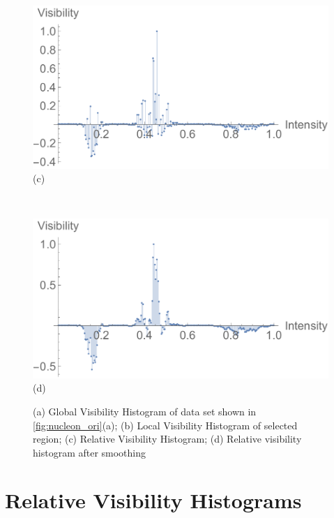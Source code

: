 \documentclass[twoside,twocolumn,10pt]{article}
\begin{document}
\begin{figure}
\begin{minipage}{.155\textwidth}
		\label{fig:local_visibility_histogram}
	\end{minipage}
	\begin{minipage}{.155\textwidth}
		\centering
		\includegraphics[width=1\linewidth]{relative_visibility_histogram}
		(c) %
		\label{fig:relative_visibility_histogram}
	\end{minipage}~
	\begin{minipage}{.155\textwidth}
		\centering
		\includegraphics[width=1\linewidth]{relative_visibility_histogram_with_gaussian}
		(d) %
		\label{fig:relative_visibility_histogram_with_gaussian}
	\end{minipage}
	\caption{(a) Global Visibility Histogram of data set shown in \autoref{fig:nucleon_ori}(a); (b) Local Visibility Histogram of selected region; (c) Relative Visibility Histogram; (d) Relative visibility histogram after smoothing}
	\label{fig:nucleon_hist}
\end{figure}

\section{Relative Visibility Histograms}
\end{document}
